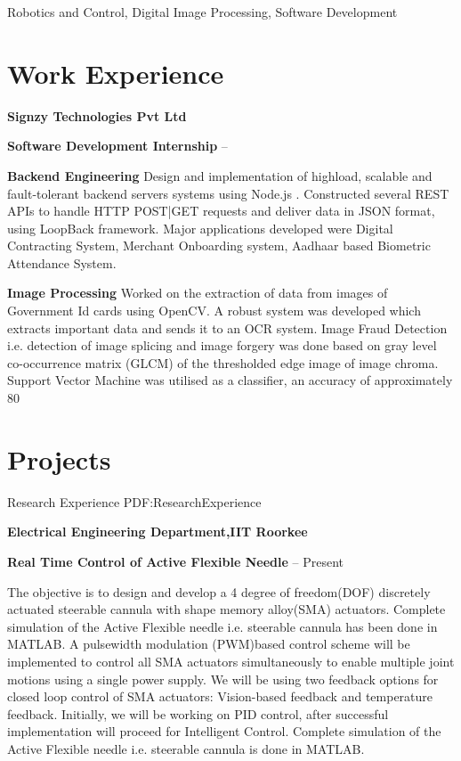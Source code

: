 \documentclass[a4paper,10pt,oneside]{article}
\begin{document}
\begin{body}
{Robotics and Control, Digital Image Processing, Software Development
\EntryGap

\section
{Work Experience}{}{}
{\textbf{Signzy Technologies Pvt Ltd}}
\par 
{\textbf{Software Development Internship}}
\hfill
{} --  
\begin{detail}

{\textbf{Backend Engineering}}
\BulletItem
Design and implementation of highload, scalable and fault-tolerant backend servers systems using Node.js .
\BulletItem
Constructed several REST APIs to handle HTTP POST|GET requests and deliver data in JSON format, using LoopBack framework.
\BulletItem
Major applications developed were Digital Contracting System, Merchant Onboarding system, Aadhaar based Biometric
Attendance System.


{\textbf{Image Processing}}
\BulletItem
Worked on the extraction of data from images of Government Id cards using OpenCV.
\BulletItem
A robust system was developed which extracts important data and sends it to an OCR system.
\BulletItem
Image Fraud Detection i.e. detection of image splicing and image forgery was done based on gray level co-occurrence
matrix (GLCM) of the thresholded edge image of image chroma.
\BulletItem
Support Vector Machine was utilised as a classifier, an accuracy of approximately 80%
\par

\end{detail}
\section
{Projects}
{Research Experience}
{PDF:ResearchExperience}

{\textbf{Electrical Engineering Department,IIT Roorkee}}
\par
{\textbf{Real Time Control of Active Flexible Needle}}
\hfill
{} --
Present
\begin{detail}
\BulletItem
The objective is to design and develop a 4 degree of freedom(DOF) discretely actuated steerable cannula with shape
memory alloy(SMA) actuators.
\BulletItem
Complete simulation of the Active Flexible needle i.e. steerable cannula has been done in MATLAB.
\BulletItem
A pulsewidth modulation (PWM)based control scheme will be implemented to control all SMA actuators simultaneously to
enable multiple joint motions using a single power supply.
\BulletItem
We will be using two feedback options for closed loop control of SMA actuators: Vision-based feedback and temperature
feedback.
\BulletItem
Initially, we will be working on PID control, after successful implementation will proceed for Intelligent Control.
Complete simulation of the Active Flexible needle i.e. steerable cannula is done in MATLAB.
\end{detail}

}
\end{body}
\end{document}

